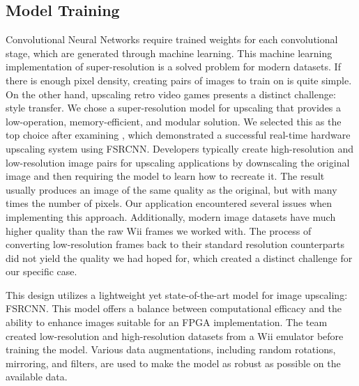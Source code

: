 \documentclass{article}
\begin{document}
    \subsection{Model Training}
        \noindent Convolutional Neural Networks require trained weights for each convolutional stage, which are generated through machine learning. This machine learning implementation of super-resolution is a solved problem for modern datasets. If there is enough pixel density, creating pairs of images to train on is quite simple. On the other hand, upscaling retro video games presents a distinct challenge: style transfer. We chose a super-resolution model for upscaling that provides a low-operation, memory-efficient, and modular solution. We selected this as the top choice after examining \cite{fsrcnn_dong_accelerating_2016}, which demonstrated a successful real-time hardware upscaling system using FSRCNN. Developers typically create high-resolution and low-resolution image pairs for upscaling applications by downscaling the original image and then requiring the model to learn how to recreate it. The result usually produces an image of the same quality as the original, but with many times the number of pixels. Our application encountered several issues when implementing this approach. Additionally, modern image datasets have much higher quality than the raw Wii frames we worked with. The process of converting low-resolution frames back to their standard resolution counterparts did not yield the quality we had hoped for, which created a distinct challenge for our specific case.
        \par This design utilizes a lightweight yet state-of-the-art model for image upscaling: FSRCNN. This model offers a balance between computational efficacy and the ability to enhance images suitable for an FPGA implementation. The team created low-resolution and high-resolution datasets from a Wii emulator before training the model. Various data augmentations, including random rotations, mirroring, and filters, are used to make the model as robust as possible on the available data.
    
\end{document}
